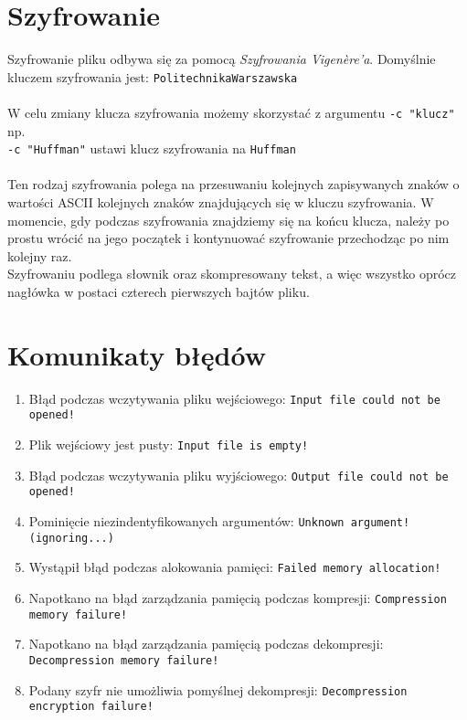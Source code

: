 \documentclass[]{article}
\begin{document}
 \section{Szyfrowanie}\label{header-n281} 
Szyfrowanie pliku odbywa się za pomocą \emph{Szyfrowania Vigenère’a}. Domyślnie kluczem szyfrowania jest: 
\texttt{Politechnika\textunderscore Warszawska} \\\\
W celu zmiany klucza szyfrowania możemy skorzystać z argumentu \texttt{-c "klucz"} np. \\
\texttt{-c "Huffman"} ustawi klucz szyfrowania na \texttt{Huffman} \\\\
Ten rodzaj szyfrowania polega na przesuwaniu kolejnych zapisywanych znaków o wartości ASCII kolejnych znaków znajdujących się w kluczu szyfrowania. W momencie, gdy podczas szyfrowania znajdziemy się na końcu klucza, należy po prostu wrócić na jego początek i kontynuować szyfrowanie przechodząc po nim kolejny raz. \\
Szyfrowaniu podlega słownik oraz skompresowany tekst, a więc wszystko oprócz nagłówka w postaci czterech pierwszych bajtów pliku.

\section{Komunikaty błędów}\label{header-n281}

\begin{enumerate}
\def\labelenumi{\arabic{enumi}.}
\item
Błąd podczas wczytywania pliku wejściowego: \texttt{Input file could not be opened!}
\item
Plik wejściowy jest pusty: \texttt{Input file is empty!}
\item
Błąd podczas wczytywania pliku wyjściowego:  \texttt{Output file could not be opened!}
\item
Pominięcie niezindentyfikowanych argumentów: \texttt{Unknown argument! (ignoring...)}
\item
Wystąpił błąd podczas alokowania pamięci: \texttt{Failed memory allocation!}
\item
Napotkano na błąd zarządzania pamięcią podczas kompresji: \texttt{Compression memory failure!}
\item
Napotkano na błąd zarządzania pamięcią podczas dekompresji: \texttt{Decompression memory failure!}
\item
Podany szyfr nie umożliwia pomyślnej dekompresji: \texttt{Decompression encryption failure!}
\end{enumerate}
\end{document}
